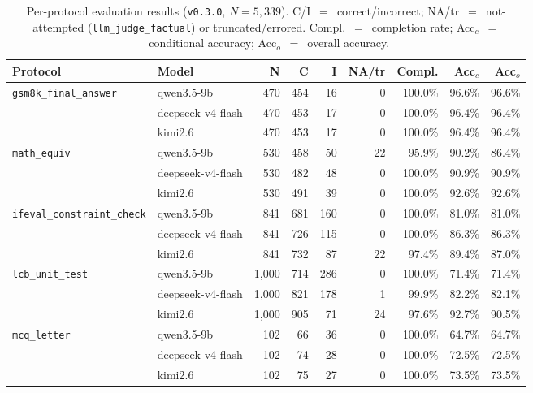 \documentclass[11pt,a4paper]{article}
\begin{document}
\begin{table}[ht]
\centering
\caption{Per-protocol evaluation results (\texttt{v0.3.0}, $N{=}5{,}339$).
C/I~$=$~correct/incorrect; NA/tr~$=$~not-attempted (\texttt{llm\_judge\_factual})
or truncated/errored. Compl.~$=$~completion rate;
Acc$_c$~$=$~conditional accuracy; Acc$_o$~$=$~overall accuracy.}
\label{tab:evalresults}
\small
\begin{tabular}{l l r r r r r r r}
\toprule
\textbf{Protocol} & \textbf{Model} & \textbf{N} & \textbf{C} & \textbf{I} & \textbf{NA/tr} & \textbf{Compl.} & \textbf{Acc$_c$} & \textbf{Acc$_o$} \\
\midrule
\multirow{3}{*}{\texttt{gsm8k\_final\_answer}}
 & qwen3.5-9b        & 470 & 454 & 16  & 0  & 100.0\% & 96.6\% & 96.6\% \\
 & deepseek-v4-flash & 470 & 453 & 17  & 0  & 100.0\% & 96.4\% & 96.4\% \\
 & kimi2.6           & 470 & 453 & 17  & 0  & 100.0\% & 96.4\% & 96.4\% \\
\midrule
\multirow{3}{*}{\texttt{math\_equiv}}
 & qwen3.5-9b        & 530 & 458 & 50  & 22 & \phantom{0}95.9\% & 90.2\% & 86.4\% \\
 & deepseek-v4-flash & 530 & 482 & 48  & 0  & 100.0\% & 90.9\% & 90.9\% \\
 & kimi2.6           & 530 & 491 & 39  & 0  & 100.0\% & 92.6\% & 92.6\% \\
\midrule
\multirow{3}{*}{\texttt{ifeval\_constraint\_check}}
 & qwen3.5-9b        & 841 & 681 & 160 & 0  & 100.0\% & 81.0\% & 81.0\% \\
 & deepseek-v4-flash & 841 & 726 & 115 & 0  & 100.0\% & 86.3\% & 86.3\% \\
 & kimi2.6           & 841 & 732 & 87  & 22 & \phantom{0}97.4\% & 89.4\% & 87.0\% \\
\midrule
\multirow{3}{*}{\texttt{lcb\_unit\_test}}
 & qwen3.5-9b        & 1{,}000 & 714 & 286 & 0  & 100.0\% & 71.4\% & 71.4\% \\
 & deepseek-v4-flash & 1{,}000 & 821 & 178 & 1  & \phantom{0}99.9\% & 82.2\% & 82.1\% \\
 & kimi2.6           & 1{,}000 & 905 & 71  & 24 & \phantom{0}97.6\% & 92.7\% & 90.5\% \\
\midrule
\multirow{3}{*}{\texttt{mcq\_letter}}
 & qwen3.5-9b        & 102 & 66  & 36  & 0  & 100.0\% & 64.7\% & 64.7\% \\
 & deepseek-v4-flash & 102 & 74  & 28  & 0  & 100.0\% & 72.5\% & 72.5\% \\
 & kimi2.6           & 102 & 75  & 27  & 0  & 100.0\% & 73.5\% & 73.5\% \\

\end{tabular}
\end{table}
\end{document}
